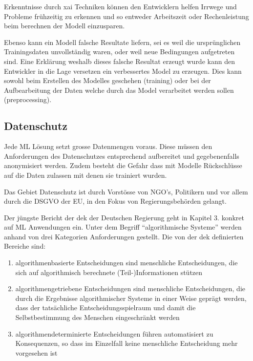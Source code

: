 \documentclass[
  12pt, %
  a4paper, %
  oneside, %
  openany, 
  numbers=noenddot, %
  BCOR=5mm, %
  parskip=half*, %
  thesis, %
]{bfhbook}
\begin{document}
Erkenntnisse durch \gls{xai} Techniken können den Entwicklern helfen Irrwege und Probleme frühzeitig zu erkennen und so entweder Arbeitszeit oder Rechenleistung beim berechnen der Modell einzusparen.

Ebenso kann ein Modell falsche Resultate liefern, sei es weil die ursprünglichen Trainingsdaten unvollständig waren, oder weil neue Bedingungen aufgetreten sind. Eine Erklärung weshalb dieses falsche Resultat erzeugt wurde kann den Entwickler in die Lage versetzen ein verbessertes Model zu erzeugen. Dies kann sowohl beim Erstellen des Modelles geschehen (training) oder bei der Aufbearbeitung der Daten welche durch das Model verarbeitet werden sollen (preprocessing).

\subsection{Datenschutz}
Jede \Gls{ML} Lösung setzt grosse Datenmengen voraus. Diese müssen den Anforderungen des Datenschutzes entsprechend aufbereitet und gegebenenfalls anonymisiert werden. Zudem besteht die Gefahr dass mit Modelle Rückschlüsse auf die Daten zulassen mit denen sie trainiert wurden.

Das Gebiet Datenschutz ist durch Vorstösse von NGO's, Politikern und vor allem durch die \acrfull{DSGVO} der EU, in den Fokus von Regierungsbehörden gelangt.

Der jüngste Bericht der \acrfull{dek} der Deutschen Regierung \parencite{datenEthik} geht in Kapitel 3. konkret auf  \Gls{ML} Anwendungen ein.
\break
Unter dem Begriff ``algorithmische Systeme'' werden anhand von drei Kategorien Anforderungen gestellt.
\break
 Die von der  \acrshort{dek} definierten Bereiche sind:
 
 \begin{enumerate}
   \item  algorithmenbasierte Entscheidungen sind menschliche Entscheidungen, die sich auf algorithmisch berechnete (Teil-)Informationen stützen
   \item algorithmengetriebene Entscheidungen sind menschliche Entscheidungen, die durch die Ergebnisse algorithmischer Systeme in einer Weise geprägt werden, dass der tatsächliche Entscheidungsspielraum und damit die Selbstbestimmung des Menschen eingeschränkt werden
   \item  algorithmendeterminierte Entscheidungen führen automatisiert zu Konsequenzen, so dass im Einzelfall keine menschliche Entscheidung mehr vorgesehen ist
\end{enumerate}
\end{document}
